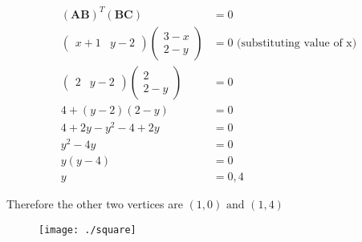 \documentclass[12pt]{article}
\let\vec\mathbf
\begin{document}
\begin{align}
(\vec{AB})^{T}(\vec{BC}) &= 0\\
\begin{pmatrix}
x+1 &
 y-2
 \end{pmatrix}
\begin{pmatrix}
3-x \\
2-y
\end{pmatrix} &= 0\text{ (substituting value of x)}\\
\begin{pmatrix}
2 &
 y-2
 \end{pmatrix}
\begin{pmatrix}
2 \\
2-y
\end{pmatrix} &= 0  \\
4 + (y-2)(2-y) &= 0\\
4 + 2y - y^{2} - 4 + 2y &= 0\\
y^{2} - 4y &= 0\\
y(y - 4) &= 0\\
y &= 0,4
\end{align}

Therefore the other two vertices are $(1,0)\text{ and }(1,4)$

\begin{figure}[!h]
	\begin{center} 
	    \texttt{[image: ./square]}
	\end{center}
\caption{}
\label{fig:Fig1}
\end{figure}
\end{document}
